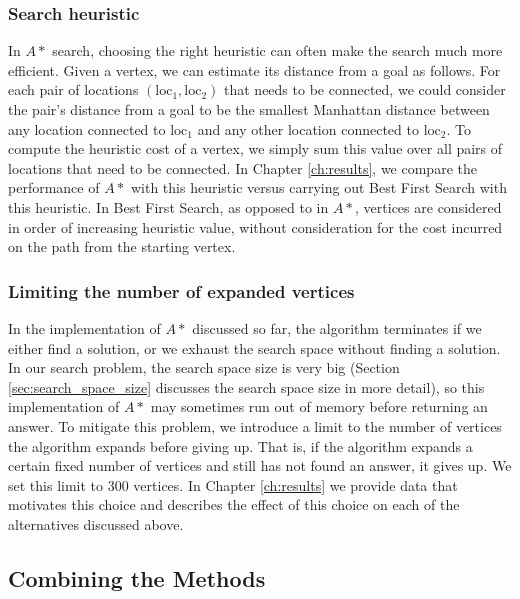 \subsubsection{Search heuristic}

In $A*$ search, choosing the right heuristic can often make the search much more
efficient. Given a
vertex, we can estimate its distance from a goal as follows. For each pair of
locations $(\text{loc}_1, \text{loc}_2)$ that needs to be connected, we could
consider the pair's distance from a
goal to be the smallest Manhattan distance between any location connected to
$\text{loc}_1$ and any other location connected to $\text{loc}_2$.
To compute the heuristic
cost of a vertex, we simply sum this value over all pairs of locations
that need to be connected. In Chapter \ref{ch:results}, we compare the
performance of $A*$ with this heuristic versus carrying out Best First Search
with this heuristic. In Best First Search, as opposed to in $A*$, vertices are
considered in order of increasing heuristic value, without consideration for
the cost incurred on the path from the starting vertex.

\subsubsection{Limiting the number of expanded vertices}

In the implementation of $A*$ discussed so far, the algorithm
terminates if we either find a solution, or we
exhaust the search space without finding a solution. In our search problem, the
search space size is very big (Section \ref{sec:search_space_size} discusses
the search space size
in more detail), so this implementation of $A*$ may sometimes run out
of memory before returning an answer.
To mitigate this problem, we introduce a limit to
the number of vertices the algorithm expands before giving up. That is, if the
algorithm expands a certain fixed number of vertices and still has not found an
answer, it gives up. We set this limit to $300$ vertices.
In Chapter \ref{ch:results} we provide data that motivates this choice and
describes the effect of this choice on each of the alternatives discussed above.

\subsection{Combining the Methods}
\label{sec:combined_alg}

